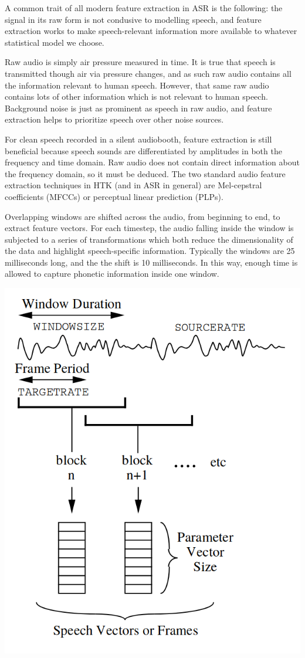 \documentclass[10pt,a4paper]{article}
\begin{document}
  A common trait of all modern feature extraction in ASR is the following: the signal in its raw form is not condusive to modelling speech, and feature extraction works to make speech-relevant information more available to whatever statistical model we choose.

  Raw audio is simply air pressure measured in time. It is true that speech is transmitted though air via pressure changes, and as such raw audio contains all the information relevant to human speech. However, that same raw audio contains lots of other information which is not relevant to human speech. Background noise is just as prominent as speech in raw audio, and feature extraction helps to prioritize speech over other noise sources.

  For clean speech recorded in a silent audiobooth, feature extraction is still beneficial because speech sounds are differentiated by amplitudes in both the frequency and time domain. Raw audio does not contain direct information about the frequency domain, so it must be deduced.
  The two standard audio feature extraction techniques in HTK (and in ASR in general) are Mel-cepstral coefficients (MFCCs) or perceptual linear prediction (PLPs).

  Overlapping windows are shifted across the audio, from beginning to end, to extract feature vectors. For each timestep, the audio falling inside the window is subjected to a series of transformations which both reduce the dimensionality of the data and highlight speech-specific information. Typically the windows are 25 milliseconds long, and the the shift is 10 milliseconds. In this way, enough time is allowed to capture phonetic information inside one window.

  
\begin{center}
\includegraphics[width=.45\textwidth,keepaspectratio]{figs/htk-feats.png}
\end{center}
\end{document}
